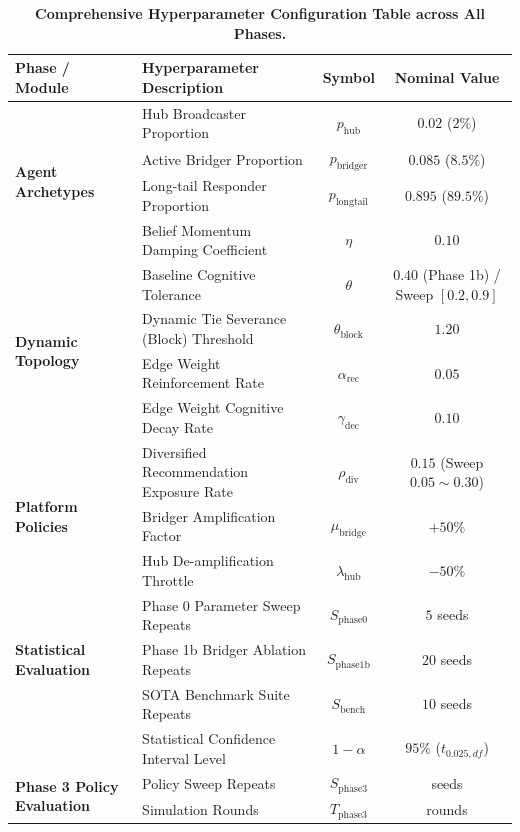 \begin{table}[t]
\centering
\small
\setlength{\tabcolsep}{5pt}
\caption{\textbf{Comprehensive Hyperparameter Configuration Table across All Phases.}}
\label{tab:hyperparameters}
\begin{tabular}{llcc}
\toprule
\textbf{Phase / Module} & \textbf{Hyperparameter Description} & \textbf{Symbol} & \textbf{Nominal Value} \\
\midrule
\multirow{4}{*}{\textbf{Agent Archetypes}} 
& Hub Broadcaster Proportion & $p_{\mathrm{hub}}$ & $0.02$ ($2\%$) \\
& Active Bridger Proportion & $p_{\mathrm{bridger}}$ & $0.085$ ($8.5\%$) \\
& Long-tail Responder Proportion & $p_{\mathrm{longtail}}$ & $0.895$ ($89.5\%$) \\
& Belief Momentum Damping Coefficient & $\eta$ & $0.10$ \\
\midrule
\multirow{4}{*}{\textbf{Dynamic Topology}} 
& Baseline Cognitive Tolerance & $\theta$ & $0.40$ (Phase 1b) / Sweep $[0.2, 0.9]$ \\
& Dynamic Tie Severance (Block) Threshold & $\theta_{\mathrm{block}}$ & $1.20$ \\
& Edge Weight Reinforcement Rate & $\alpha_{\mathrm{rec}}$ & $0.05$ \\
& Edge Weight Cognitive Decay Rate & $\gamma_{\mathrm{dec}}$ & $0.10$ \\
\midrule
\multirow{3}{*}{\textbf{Platform Policies}} 
& Diversified Recommendation Exposure Rate & $\rho_{\mathrm{div}}$ & $0.15$ (Sweep $0.05 \sim 0.30$) \\
& Bridger Amplification Factor & $\mu_{\mathrm{bridge}}$ & $+50\%$ \\
& Hub De-amplification Throttle & $\lambda_{\mathrm{hub}}$ & $-50\%$ \\
\midrule
\multirow{3}{*}{\textbf{Statistical Evaluation}} 
& Phase 0 Parameter Sweep Repeats & $S_{\mathrm{phase0}}$ & $5$ seeds \\
& Phase 1b Bridger Ablation Repeats & $S_{\mathrm{phase1b}}$ & $20$ seeds \\
& SOTA Benchmark Suite Repeats & $S_{\mathrm{bench}}$ & $10$ seeds \\
& Statistical Confidence Interval Level & $1 - \alpha$ & $95\%$ ($t_{0.025, df}$) \\
\midrule
\multirow{5}{*}{\textbf{Phase 3 Policy Evaluation}} 
& Policy Sweep Repeats & $S_{\mathrm{phase3}}$ & \HThreeSeeds{} seeds \\
& Simulation Rounds & $T_{\mathrm{phase3}}$ & \HThreeRounds{} rounds \\

\end{tabular}
\end{table}
